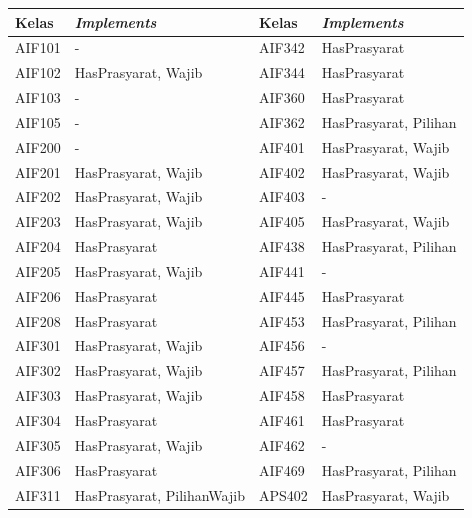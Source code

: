 \documentclass[a4paper,twoside]{article}
\begin{document}
\begin{enumerate}
\begin{enumerate}
\begin{enumerate}
\begin{table}[H]
	\centering
    \begin{tabular}{|p{2.5cm}|p{4.5cm}|p{2.5cm}|p{4.5cm}|}
		\hline
		Kelas & \textit{Implements} & Kelas & \textit{Implements}\\
		\hline
    AIF101  & - &    AIF342  & HasPrasyarat               \\
    AIF102  & HasPrasyarat, Wajib        &    AIF344  & HasPrasyarat               \\
    AIF103  & -                          &    AIF360  & HasPrasyarat               \\
    AIF105  & -                          &    AIF362  & HasPrasyarat, Pilihan      \\
    AIF200  & -                          &    AIF401  & HasPrasyarat, Wajib        \\
    AIF201  & HasPrasyarat, Wajib        &    AIF402  & HasPrasyarat, Wajib        \\
    AIF202  & HasPrasyarat, Wajib        &    AIF403  & -                          \\
    AIF203  & HasPrasyarat, Wajib        &    AIF405  & HasPrasyarat, Wajib        \\
    AIF204  & HasPrasyarat               &    AIF438  & HasPrasyarat, Pilihan      \\
    AIF205  & HasPrasyarat, Wajib        &    AIF441  & -                          \\
    AIF206  & HasPrasyarat               &    AIF445  & HasPrasyarat               \\
    AIF208  & HasPrasyarat               &    AIF453  & HasPrasyarat, Pilihan      \\
    AIF301  & HasPrasyarat, Wajib        &    AIF456  & -                          \\
    AIF302  & HasPrasyarat, Wajib        &    AIF457  & HasPrasyarat, Pilihan      \\
    AIF303  & HasPrasyarat, Wajib        &    AIF458  & HasPrasyarat               \\
    AIF304  & HasPrasyarat               &    AIF461  & HasPrasyarat               \\
    AIF305  & HasPrasyarat, Wajib        &    AIF462  & -                          \\
    AIF306  & HasPrasyarat               &    AIF469  & HasPrasyarat, Pilihan      \\
    AIF311  & HasPrasyarat, PilihanWajib &    APS402  & HasPrasyarat, Wajib        \\

\end{tabular}
\end{table}
\end{enumerate}
\end{enumerate}
\end{enumerate}
\end{document}
